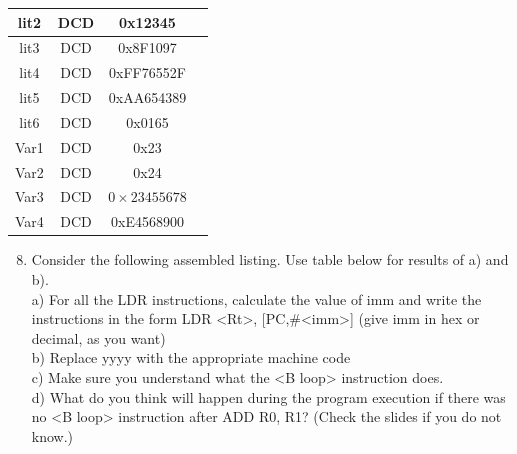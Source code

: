 \documentclass[10pt]{article}
\begin{document}
\begin{center}
\begin{tabular}{|c|c|c|c|}
\hline
lit2 & DCD & 0x12345 &  \\
\hline
lit3 & DCD & 0x8F1097 &  \\
\hline
lit4 & DCD & 0xFF76552F &  \\
\hline
lit5 & DCD & 0xAA654389 &  \\
\hline
lit6 & DCD & 0x0165 &  \\
\hline
Var1 & DCD & 0x23 &  \\
\hline
Var2 & DCD & 0x24 &  \\
\hline
Var3 & DCD & $0 \times 23455678$ &  \\
\hline
Var4 & DCD & 0xE4568900 &  \\
\hline
\end{tabular}
\end{center}

\begin{enumerate}
  \setcounter{enumi}{7}
  \item Consider the following assembled listing. Use table below for results of a) and b).\\
a) For all the LDR instructions, calculate the value of imm and write the instructions in the form LDR <Rt>, [PC,\#<imm>] (give imm in hex or decimal, as you want)\\
b) Replace yyyy with the appropriate machine code\\
c) Make sure you understand what the <B loop> instruction does.\\
d) What do you think will happen during the program execution if there was no <B loop> instruction after ADD R0, R1? (Check the slides if you do not know.)
\end{enumerate}
\end{document}
